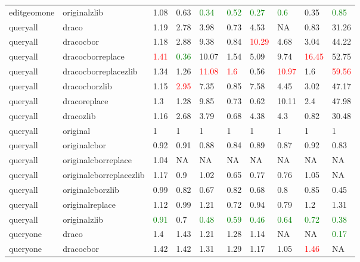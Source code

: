 \begin{landscape}
\begin{longtable}{llllllllll}
\rowcolor{lightgray}  editgeomone & originalzlib & 1.08 & 0.63 & \textcolor{green}{0.34} & \textcolor{green}{0.52} & \textcolor{green}{0.27} & \textcolor{green}{0.6} & 0.35 & \textcolor{green}{0.85}\\
\rowcolor{lightgray}  queryall & draco & 1.19 & 2.78 & 3.98 & 0.73 & 4.53 & NA & 0.83 & 31.26\\
\rowcolor{lightgray}  queryall & dracocbor & 1.18 & 2.88 & 9.38 & 0.84 & \textcolor{red}{10.29} & 4.68 & 3.04 & 44.22\\
\rowcolor{lightgray}  queryall & dracocborreplace & \textcolor{red}{1.41} & \textcolor{green}{0.36} & 10.07 & 1.54 & 5.09 & 9.74 & \textcolor{red}{16.45} & 52.75\\
\rowcolor{lightgray}  queryall & dracocborreplacezlib & 1.34 & 1.26 & \textcolor{red}{11.08} & \textcolor{red}{1.6} & 0.56 & \textcolor{red}{10.97} & 1.6 & \textcolor{red}{59.56}\\
\rowcolor{lightgray}  queryall & dracocborzlib & 1.15 & \textcolor{red}{2.95} & 7.35 & 0.85 & 7.58 & 4.45 & 3.02 & 47.17\\
\rowcolor{lightgray}  queryall & dracoreplace & 1.3 & 1.28 & 9.85 & 0.73 & 0.62 & 10.11 & 2.4 & 47.98\\
\rowcolor{lightgray}  queryall & dracozlib & 1.16 & 2.68 & 3.79 & 0.68 & 4.38 & 4.3 & 0.82 & 30.48\\
queryall & original & 1 & 1 & 1 & 1 & 1 & 1 & 1 & 1\\
queryall & originalcbor & 0.92 & 0.91 & 0.88 & 0.84 & 0.89 & 0.87 & 0.92 & 0.83\\
queryall & originalcborreplace & 1.04 & NA & NA & NA & NA & NA & NA & NA\\
queryall & originalcborreplacezlib & 1.17 & 0.9 & 1.02 & 0.65 & 0.77 & 0.76 & 1.05 & NA\\
queryall & originalcborzlib & 0.99 & 0.82 & 0.67 & 0.82 & 0.68 & 0.8 & 0.85 & 0.45\\
queryall & originalreplace & 1.12 & 0.99 & 1.21 & 0.72 & 0.94 & 0.79 & 1.2 & 1.31\\
queryall & originalzlib & \textcolor{green}{0.91} & 0.7 & \textcolor{green}{0.48} & \textcolor{green}{0.59} & \textcolor{green}{0.46} & \textcolor{green}{0.64} & \textcolor{green}{0.72} & \textcolor{green}{0.38}\\
queryone & draco & 1.4 & 1.43 & 1.21 & 1.28 & 1.14 & NA & NA & \textcolor{green}{0.17}\\
queryone & dracocbor & 1.42 & 1.42 & 1.31 & 1.29 & 1.17 & 1.05 & \textcolor{red}{1.46} & NA\\

\end{longtable}
\end{landscape}
